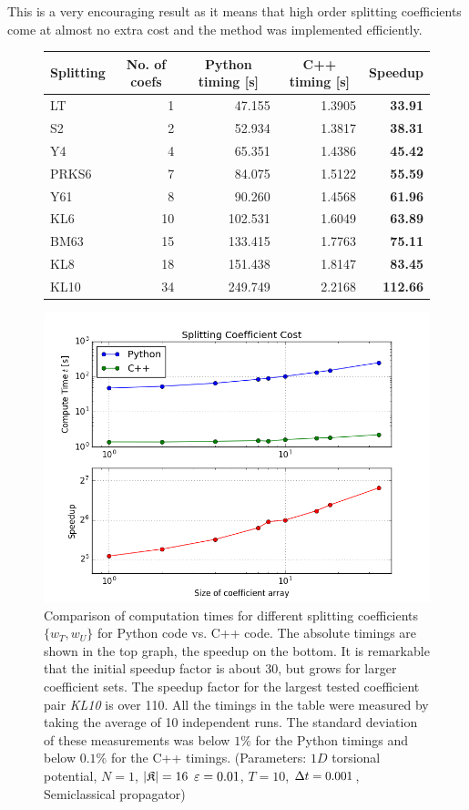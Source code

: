 This is a very encouraging result as it means that high order splitting coefficients come at almost no extra cost and the  method was implemented efficiently.
\par\medskip
%
\begin{figure}[ht]
	\centering
	\begin{tabular}{|l | r | r | r | r |} 
		\hline
		\multicolumn{1}{|c}{\textbf{Splitting}} &
		\multicolumn{1}{|c}{\textbf{No. of coefs}} &
		\multicolumn{1}{|c}{\textbf{Python timing [s]}} &
		\multicolumn{1}{|c}{\textbf{C++ timing [s]}} &
		\multicolumn{1}{|c|}{\textbf{Speedup}} \\
		\hline
		LT &1 &47.155 &1.3905 &\textbf{33.91} \\
		S2 &2 &52.934 &1.3817 &\textbf{38.31} \\
		Y4 &4 &65.351 &1.4386 &\textbf{45.42} \\
		PRKS6 &7 &84.075 &1.5122 &\textbf{55.59} \\
		Y61 &8 &90.260 &1.4568 &\textbf{61.96} \\
		KL6 &10 &102.531 &1.6049 &\textbf{63.89} \\
		BM63 &15 &133.415 &1.7763 &\textbf{75.11} \\
		KL8 &18 &151.438 &1.8147 &\textbf{83.45} \\
		KL10 &34 &249.749 &2.2168 &\textbf{112.66} \\
		\hline
	\end{tabular}
	\begin{center}
	\includegraphics[width=.8\textwidth]{figures/coefs.png}
	\end{center}
	\caption{Comparison of computation times for different splitting coefficients $\{ w_T, w_U \}$ for Python code vs. C++ code. The absolute timings are shown in the top graph, the speedup on the bottom. It is remarkable that the initial speedup factor is about 30, but grows for larger coefficient sets. The speedup factor for the largest tested coefficient pair \emph{KL10} is over 110.
	All the timings in the table were measured by taking the average of 10 independent runs. The standard deviation of these measurements was below $1\%$ for the Python timings and below $0.1\%$ for the C++ timings. (Parameters: $1D$ torsional potential, $N=1$, $|\mathfrak{K}|=16$ $\varepsilon=0.01$, $T=10$, $\Delta t=0.001$, Semiclassical propagator)}
	\label{fig:benchmarksplit}
\end{figure}


